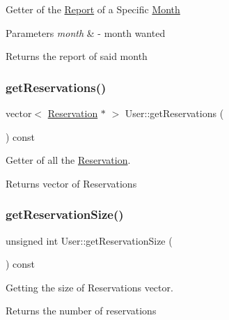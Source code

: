 Getter of the \mbox{\hyperlink{class_report}{Report}} of a Specific \mbox{\hyperlink{class_month}{Month}} 
\begin{DoxyParams}{Parameters}
{\em month} & -\/ month wanted \\
\hline
\end{DoxyParams}
\begin{DoxyReturn}{Returns}
the report of said month 
\end{DoxyReturn}
\mbox{\label{class_user_a52c283b101a310a3be644bb9f8552f34}} 
\subsubsection{\texorpdfstring{get\+Reservations()}{getReservations()}}
{\footnotesize\ttfamily vector$<$ \mbox{\hyperlink{class_reservation}{Reservation}} $\ast$ $>$ User\+::get\+Reservations (\begin{DoxyParamCaption}{ }\end{DoxyParamCaption}) const}



Getter of all the \mbox{\hyperlink{class_reservation}{Reservation}}. 

\begin{DoxyReturn}{Returns}
vector of Reservations 
\end{DoxyReturn}
\mbox{\label{class_user_ad87b45e028489ed785fa82a4c9fc6739}} 
\subsubsection{\texorpdfstring{get\+Reservation\+Size()}{getReservationSize()}}
{\footnotesize\ttfamily unsigned int User\+::get\+Reservation\+Size (\begin{DoxyParamCaption}{ }\end{DoxyParamCaption}) const}



Getting the size of Reservations vector. 

\begin{DoxyReturn}{Returns}
the number of reservations 
\end{DoxyReturn}
\mbox{\label{class_user_aafe37a3bb0e14e669e42f2fee9e0ce29}} 
